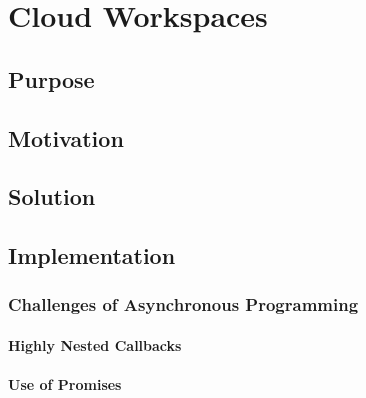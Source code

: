 \chapter{Cloud Workspaces}

\section{Purpose}

\section{Motivation}

\section{Solution}

\section{Implementation}

\subsection{Challenges of Asynchronous Programming}
\subsubsection{Highly Nested Callbacks}
\subsubsection{Use of Promises}